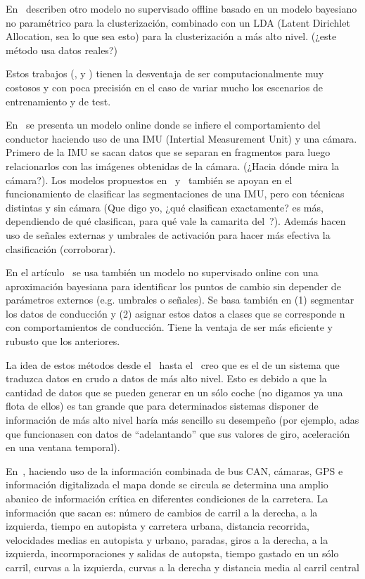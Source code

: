 En~\cite{bando2013unsupervised} describen otro modelo no supervisado offline basado en un modelo bayesiano no paramétrico para la clusterización, combinado con un LDA (Latent Dirichlet Allocation, sea lo que sea esto) para la clusterización a más alto nivel. (\TODO ¿este método usa datos reales?)

Estos trabajos (\cite{sekizawa2007modeling}, \cite{terada2010multi} y \cite{bando2013unsupervised}) tienen la desventaja de ser computacionalmente muy costosos y con poca precisión en el caso de variar mucho los escenarios de entrenamiento y de test.

En~\cite{maye2011bayesian} se presenta un modelo online donde se infiere el comportamiento del conductor haciendo uso de una IMU (Intertial Measurement Unit) y una cámara. Primero de la IMU se sacan datos que se separan en fragmentos para luego relacionarlos con las imágenes obtenidas de la cámara. (\TODO ¿Hacia dónde mira la cámara?). Los modelos propuestos en~\cite{johnson2011driving} y~\cite{van2013driver} también se apoyan en el funcionamiento de clasificar las segmentaciones de una IMU, pero con técnicas distintas y sin cámara (\TODO Que digo yo, ¿qué clasifican exactamente? es más, dependiendo de qué clasifican, para qué vale la camarita del~\cite{maye2011bayesian}?). Además hacen uso de señales externas y umbrales de activación para hacer más efectiva la clasificación (\TODO corroborar).

En el artículo~\cite{bender2015unsupervised} se usa también un modelo no supervisado online con una aproximación bayesiana para identificar los puntos de cambio sin depender de parámetros externos (e.g. umbrales o señales). Se basa también en (1) segmentar los datos de conducción y (2) asignar estos datos a clases que se corresponde n con comportamientos de conducción. Tiene la ventaja de ser más eficiente y rubusto que los anteriores.

La idea de estos métodos desde el~\cite{sekizawa2007modeling} hasta el~\cite{bender2015unsupervised} creo que es el de un sistema que traduzca datos en crudo a datos de más alto nivel. Esto es debido a que la cantidad de datos que se pueden generar en un sólo coche (no digamos ya una flota de ellos) es tan grande que para determinados sistemas disponer de información de más alto nivel haría más sencillo su desempeño (por ejemplo, \gls{adas} que funcionasen con datos de \enquote{adelantando} que sus valores de giro, aceleración en una ventana temporal).

En~\cite{satzoda2013towards}, haciendo uso de la información combinada de bus CAN, cámaras, GPS e información digitalizada el mapa donde se circula se determina una amplio abanico de información crítica en diferentes condiciones de la carretera. La información que sacan es: número de cambios de carril a la derecha, a la izquierda, tiempo en autopista y carretera urbana, distancia recorrida, velocidades medias en autopista y urbano, paradas, giros a la derecha, a la izquierda, incormporaciones y salidas de autopsta, tiempo gastado en un sólo carril, curvas a la izquierda, curvas a la derecha y distancia media al carril central

